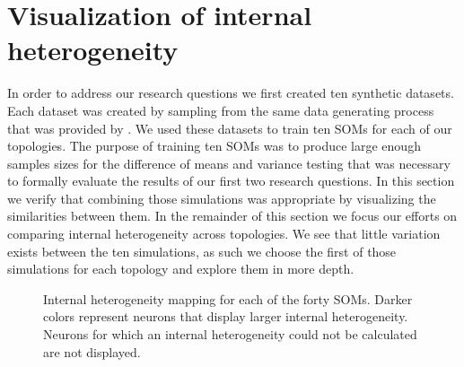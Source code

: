 \section{Visualization of internal heterogeneity}
\label{rdq3}
In order to address our research questions we first created ten synthetic
datasets.  Each dataset was created by sampling from the same data generating process
that was provided by \cite{wu2006}.  We used these datasets to train ten
SOMs for each of our topologies.  The purpose of training ten SOMs was to
produce large enough samples sizes for the difference of means and variance
testing that was necessary to formally evaluate the results of our first two
research questions.  In this section we verify that combining those
simulations was appropriate by visualizing the similarities between them.
In the remainder of this section we focus our efforts on comparing internal
heterogeneity across
topologies.  We see that little variation exists between the ten
simulations, as such we choose the first of those simulations for each topology and
explore them in more depth.

\begin{figure}[htb]
\centering
\begin{minipage}{\textwidth}
\caption{Internal heterogeneity mapping for each of the forty SOMs. Darker colors
represent neurons that display larger internal heterogeneity. Neurons for which
an internal heterogeneity could not be calculated are not displayed.}
\label{ten}
\end{minipage}
\end{figure}

